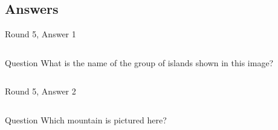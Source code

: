 \documentclass[11pt]{beamer}
\begin{document}
\subsection{Answers}
\begin{frame}[t]{Round 5, Answer 1}
\begin{columns}[T,totalwidth=\linewidth]
\begin{column}{0.32\linewidth}
\begin{block}{Question}
What is the name of the group of islands shown in this image?
\end{block}
\end{column}
\begin{column}{0.65\linewidth}
\begin{center}
\texttt{[image: \{Images/galapagos]}.png}
\end{center}
\end{column}
\end{columns}
\end{frame}
\begin{frame}[t]{Round 5, Answer 2}
\begin{columns}[T,totalwidth=\linewidth]
\begin{column}{0.32\linewidth}
\begin{block}{Question}
Which mountain is pictured here?
\end{block}
\end{column}
\begin{column}{0.65\linewidth}
\begin{center}
\texttt{[image: \{Images/materhorn]}.jpg}
\end{center}
\end{column}
\end{columns}
\end{frame}
\end{document}
